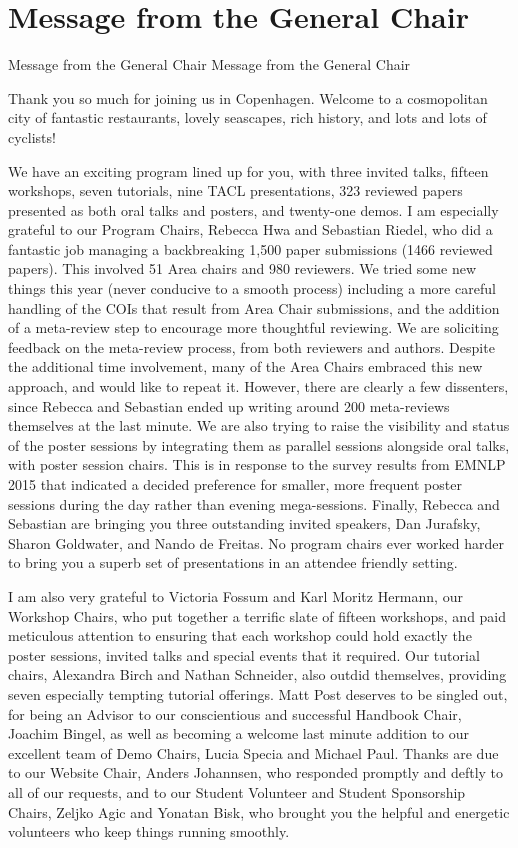 \section{Message from the General Chair}\vspace{2em}
\setheaders%
    {Message from the General Chair}%
    {Message from the General Chair}
\thispagestyle{emptyheader}

\setlength{\parskip}{1ex}

Thank you so much for joining us in Copenhagen.  Welcome to a cosmopolitan city of fantastic restaurants, lovely seascapes, rich history, and lots and lots of cyclists! 

We have an exciting program lined up for you, with three invited talks, fifteen workshops, seven tutorials, nine TACL presentations, 323 reviewed papers presented as both oral talks and posters, and twenty-one demos.  I am especially grateful to our Program Chairs, Rebecca Hwa and Sebastian Riedel, who did a fantastic job managing a backbreaking 1,500 paper submissions (1466 reviewed papers).  This involved 51 Area chairs and 980 reviewers.  We tried some new things this year (never conducive to a smooth process) including a more careful handling of the COIs that result from Area Chair submissions, and the addition of a meta-review step to encourage more thoughtful reviewing.  We are soliciting feedback on the meta-review process, from both reviewers and authors.  Despite the additional time involvement, many of the Area Chairs embraced this new approach, and would like to repeat it. However, there are clearly a few dissenters, since Rebecca and Sebastian ended up writing around 200 meta-reviews themselves at the last minute.  We are also trying to raise the visibility and status of the poster sessions by integrating them as parallel sessions alongside oral talks, with poster session chairs.  This is in response to the survey results from EMNLP 2015 that indicated a decided preference for smaller, more frequent poster sessions during the day rather than evening mega-sessions.  Finally, Rebecca and Sebastian are bringing you three outstanding invited speakers, Dan Jurafsky, Sharon Goldwater, and Nando de Freitas.   No program chairs ever worked harder to bring you a superb set of presentations in an attendee friendly setting.

I am also very grateful to Victoria Fossum and Karl Moritz Hermann, our Workshop Chairs, who put together a terrific slate of fifteen workshops, and paid meticulous attention to ensuring that each workshop could hold exactly the poster sessions, invited talks and special events that it required.  Our tutorial chairs, Alexandra Birch and Nathan Schneider, also outdid themselves, providing seven especially tempting tutorial offerings.  Matt Post deserves to be singled out, for being an Advisor to our conscientious and successful Handbook Chair, Joachim Bingel, as well as becoming a welcome last minute addition to our excellent team of Demo Chairs, Lucia Specia and Michael Paul.  Thanks are due to our Website Chair, Anders Johannsen, who responded promptly and deftly to all of our requests, and to our Student Volunteer and Student Sponsorship Chairs, Zeljko Agic and Yonatan Bisk, who brought you the helpful and energetic volunteers who keep things running smoothly.

